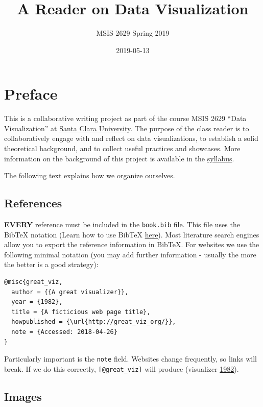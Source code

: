 \documentclass[]{book}
\title{A Reader on Data Visualization}
\author{MSIS 2629 Spring 2019}
\date{2019-05-13}
\begin{document}
\maketitle

{
\setcounter{tocdepth}{1}
\tableofcontents
}
\hypertarget{preface}{%
\chapter{Preface}\label{preface}}

This is a collaborative writing project as part of the course MSIS 2629 ``Data Visualization'' at \href{http://www.scu.edu}{Santa Clara University}. The purpose of the class reader is to collaboratively engage with and reflect on data visualizations, to establish a solid theoretical background, and to collect useful practices and showcases. More information on the background of this project is available in the \href{https://mschermann.github.io/msis2629spring2019}{syllabus}.

The following text explains how we organize ourselves.

\hypertarget{references}{%
\section{References}\label{references}}

\textbf{EVERY} reference must be included in the \texttt{book.bib} file. This file uses the BibTeX notation (Learn how to use BibTeX \href{http://www.bibtex.org/Using/}{here}). Most literature search engines allow you to export the reference information in BibTeX. For websites we use the following minimal notation (you may add further information - usually the more the better is a good strategy):

\begin{verbatim}
@misc{great_viz,
  author = {{A great visualizer}},
  year = {1982},
  title = {A ficticious web page title},
  howpublished = {\url{http://great_viz_org/}},
  note = {Accessed: 2018-04-26}
}
\end{verbatim}

Particularly important is the \texttt{note} field. Websites change frequently, so links will break. If we do this correctly, \texttt{{[}@great\_viz{]}} will produce (visualizer \protect\hyperlink{ref-great_viz}{1982}).

\hypertarget{images}{%
\section{Images}\label{images}}
\end{document}
